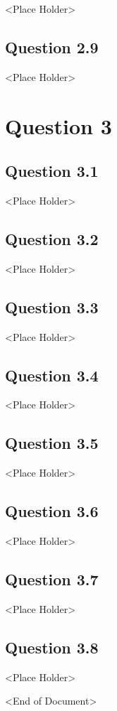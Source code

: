 \documentclass[parskip=full]{scrartcl}
\begin{document}
    <Place Holder>

    \subsection*{Question 2.9}
    
    <Place Holder>

    
\section*{Question 3}
    \subsection*{Question 3.1}
    
    <Place Holder>

    \subsection*{Question 3.2}
    
    <Place Holder>

    \subsection*{Question 3.3}
    
    <Place Holder>

    \subsection*{Question 3.4}
    
    <Place Holder>

    \subsection*{Question 3.5}
    
    <Place Holder>

    \subsection*{Question 3.6}
    
    <Place Holder>

    \subsection*{Question 3.7}
    
    <Place Holder>

    \subsection*{Question 3.8}
    
    <Place Holder>

    \begin{center}
        <End of Document>
    \end{center}
\end{document}
